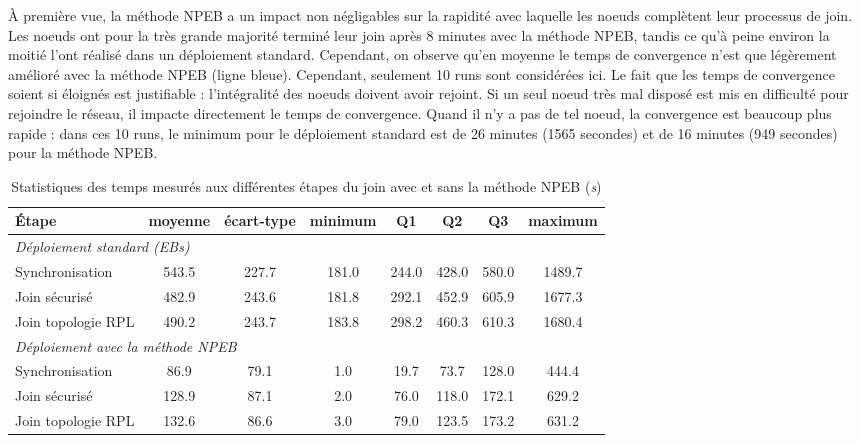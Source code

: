 \documentclass[]{report}
\begin{document}
À première vue, la méthode NPEB a un impact non négligables sur la rapidité avec laquelle les noeuds complètent leur processus de join. Les noeuds ont pour la très grande majorité terminé leur join après 8 minutes avec la méthode NPEB, tandis ce qu'à peine environ la moitié l'ont réalisé dans un déploiement standard. Cependant, on observe qu'en moyenne le temps de convergence n'est que légèrement amélioré avec la méthode NPEB (ligne bleue). Cependant, seulement 10 runs sont considérées ici. Le fait que les temps de convergence soient si éloignés est justifiable : l'intégralité des noeuds doivent avoir rejoint. Si un seul noeud très mal disposé est mis en difficulté pour rejoindre le réseau, il impacte directement le temps de convergence. Quand il n'y a pas de tel noeud, la convergence est beaucoup plus rapide : dans ces 10 runs, le minimum pour le déploiement standard est de 26 minutes (1565 secondes) et de 16 minutes (949 secondes) pour la méthode NPEB.

\newpage

\begin{table}[h]
\centering
\begin{tabular}{|l|c|c|c|c|c|c|c|}
	\hline
    \textbf{\textbf{Étape}} & moyenne & écart-type & minimum & Q1 & Q2 & Q3 & maximum\\
    \hline
    \multicolumn{8}{|l|}{\textit{Déploiement standard (EBs)}}\\  
    \hline
    Synchronisation & 543.5 & 227.7 & 181.0 & 244.0 & 428.0 & 580.0 & 1489.7 \\
    \hline
    Join sécurisé & 482.9 & 243.6 & 181.8 & 292.1 & 452.9 & 605.9 & 1677.3 \\
    \hline
    Join topologie RPL & 490.2 & 243.7 & 183.8 & 298.2 & 460.3 & 610.3 & 1680.4 \\
    \hline
    \multicolumn{8}{|l|}{\textit{Déploiement avec la méthode NPEB}}\\    
    \hline
    Synchronisation & 86.9 & 79.1 & 1.0 & 19.7 & 73.7 & 128.0 & 444.4 \\
    \hline
    Join sécurisé & 128.9 & 87.1 & 2.0 & 76.0 & 118.0 & 172.1 & 629.2 \\
    \hline
    Join topologie RPL & 132.6 & 86.6 & 3.0 & 79.0 & 123.5 & 173.2 & 631.2 \\
    \hline
\end{tabular}
\caption{Statistiques des temps mesurés aux différentes étapes du join avec et sans la méthode NPEB (\textit{s})}
\label{table_times}
\end{table}
\end{document}
